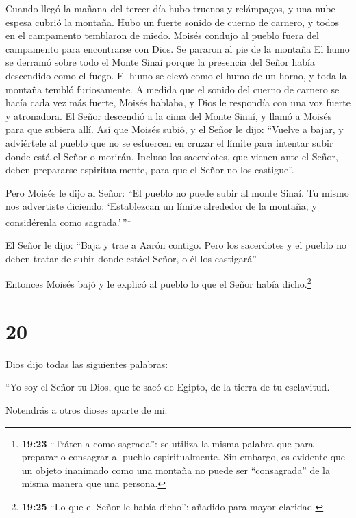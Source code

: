  Cuando llegó la mañana del tercer día hubo truenos y
relámpagos, y una nube espesa cubrió la montaña. Hubo un fuerte sonido
de cuerno de carnero, y todos en el campamento temblaron de miedo.
 Moisés condujo al pueblo fuera del campamento para
encontrarse con Dios. Se pararon al pie de la montaña  El
humo se derramó sobre todo el Monte Sinaí porque la presencia del Señor
había descendido como el fuego. El humo se elevó como el humo de un
horno, y toda la montaña tembló furiosamente.  A medida que
el sonido del cuerno de carnero se hacía cada vez más fuerte, Moisés
hablaba, y Dios le respondía con una voz fuerte y atronadora.
 El Señor descendió a la cima del Monte Sinaí, y llamó a
Moisés para que subiera allí. Así que Moisés subió,  y el
Señor le dijo: ``Vuelve a bajar, y adviértele al pueblo que no se
esfuercen en cruzar el límite para intentar subir donde está el Señor o
morirán.  Incluso los sacerdotes, que vienen ante el Señor,
deben prepararse espiritualmente, para que el Señor no los castigue''.

 Pero Moisés le dijo al Señor: ``El pueblo no puede subir
al monte Sinaí. Tu mismo nos advertiste diciendo: `Establezcan un límite
alrededor de la montaña, y considérenla como sagrada.'\,''\footnote{\textbf{19:23}
  ``Trátenla como sagrada'': se utiliza la misma palabra que para
  preparar o consagrar al pueblo espiritualmente. Sin embargo, es
  evidente que un objeto inanimado como una montaña no puede ser
  ``consagrada'' de la misma manera que una persona.}

 El Señor le dijo: ``Baja y trae a Aarón contigo. Pero los
sacerdotes y el pueblo no deben tratar de subir donde estáel Señor, o él
los castigará''

 Entonces Moisés bajó y le explicó al pueblo lo que el
Señor había dicho.\footnote{\textbf{19:25} ``Lo que el Señor le había
  dicho'': añadido para mayor claridad.}

\hypertarget{section-19}{%
\section{20}\label{section-19}}

 Dios dijo todas las siguientes palabras:

 ``Yo soy el Señor tu Dios, que te sacó de Egipto, de la
tierra de tu esclavitud.

 Notendrás a otros dioses aparte de mi.

